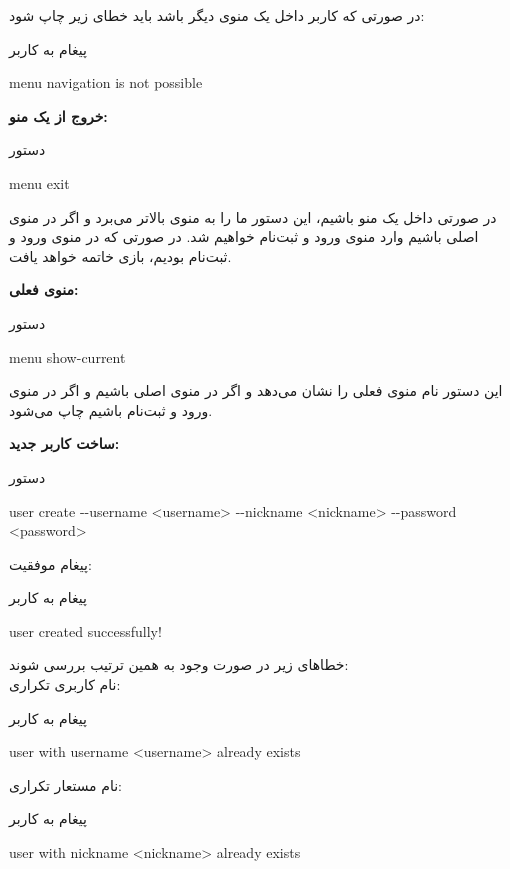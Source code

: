 \documentclass[]{article}
\begin{document}
در صورتی که کاربر داخل یک منوی دیگر باشد باید خطای زیر چاپ شود:
\\
\begin{mybox}[colback=yellow]{پیغام به کاربر}
	\begin{latin}	
		menu navigation is not possible
	\end{latin}
\end{mybox}

\vspace{.5cm}
\textbf{خروج از یک منو:}
\begin{mybox}[colback=yellow]{دستور}
	\begin{latin}	
		menu exit
	\end{latin}
\end{mybox}
در صورتی داخل یک منو باشیم، این دستور ما را به منوی بالاتر می‌برد و اگر در 
منوی اصلی باشیم وارد منوی ورود و ثبت‌نام خواهیم شد. در صورتی که در منوی 
ورود 
و ثبت‌نام بودیم، بازی خاتمه خواهد یافت.

\vspace{.5cm}
\newpage
\textbf{منوی فعلی:}
\begin{mybox}[colback=yellow]{دستور}
	\begin{latin}	
		menu show-current 
	\end{latin}
\end{mybox}
این دستور نام منوی فعلی را نشان می‌دهد و اگر در منوی اصلی باشیم 
 و اگر در منوی ورود و ثبت‌نام باشیم  چاپ می‌شود.

\vspace{.5cm}
\textbf{ساخت کاربر جدید:}
\begin{mybox}[colback=yellow]{دستور}
	\begin{latin}	
		user create -{}-username <username> -{}-nickname <nickname> 
		-{}-password 
		<password>
	\end{latin}
\end{mybox}
پیغام موفقیت:
\begin{mybox}[colback=yellow]{پیغام به کاربر}
	\begin{latin}	
		user created successfully!
	\end{latin}
\end{mybox}
خطا‌های زیر در صورت وجود به همین ترتیب بررسی شوند:
\\
نام کاربری تکراری:
\begin{mybox}[colback=yellow]{پیغام به کاربر}
	\begin{latin}	
		user with username <username> already exists
	\end{latin}
\end{mybox}
نام مستعار تکراری:
\begin{mybox}[colback=yellow]{پیغام به کاربر}
	\begin{latin}	
		user with nickname <nickname> already exists
	\end{latin}
\end{mybox}
\end{document}
